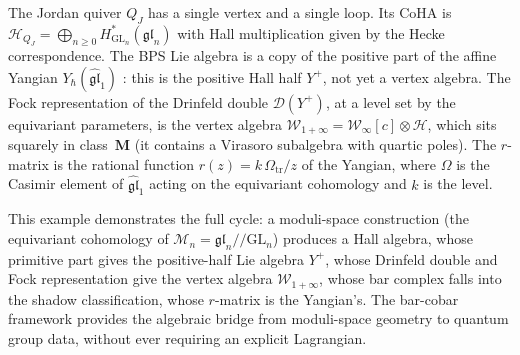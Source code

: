 \begin{example}
\label{ex:jordan-coha}
The Jordan quiver $Q_J$ has a single vertex and a single loop.
Its CoHA is
$\mathcal{H}_{Q_J} = \bigoplus_{n \ge 0}
H^*_{\mathrm{GL}_n}(\mathfrak{gl}_n)$
with Hall multiplication given by the Hecke correspondence.
The BPS Lie algebra is a copy of the positive part
of the affine Yangian $Y_\hbar(\widehat{\mathfrak{gl}}_1)$
\cite{SV13}: this is the positive Hall half $Y^+$, not yet a
vertex algebra. The Fock representation of the Drinfeld double
$\mathcal{D}(Y^+)$, at a level set by the equivariant parameters,
is the vertex algebra $\mathcal{W}_{1+\infty} = \mathcal{W}_\infty[c] \otimes \mathcal{H}$,
which sits squarely in class~$\mathbf{M}$ (it contains a Virasoro
subalgebra with quartic poles). The $r$-matrix is the rational function
$r(z) = k\,\Omega_{\mathrm{tr}}/z$ of the Yangian, where $\Omega$ is the
Casimir element of $\widehat{\mathfrak{gl}}_1$ acting on
the equivariant cohomology and $k$ is the level.

This example demonstrates the full cycle: a moduli-space
construction (the equivariant cohomology of
$\mathcal{M}_n = \mathfrak{gl}_n /\!\!/ \mathrm{GL}_n$)
produces a Hall algebra, whose primitive part gives the positive-half
Lie algebra $Y^+$, whose Drinfeld double and Fock representation give
the vertex algebra $\mathcal{W}_{1+\infty}$, whose
bar complex falls into the shadow classification, whose
$r$-matrix is the Yangian's. The bar-cobar framework provides
the algebraic bridge from moduli-space geometry to quantum group
data, without ever requiring an explicit Lagrangian.
\end{example}

